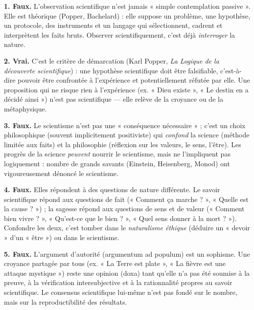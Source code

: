 \documentclass[11pt]{article}
\newcommand{\cle}[1]{{\popxbold\color{popdark}#1}}
\begin{document}
\begin{corrige}
\textbf{1. Faux.} L'observation scientifique n'est jamais « simple contemplation passive ». Elle est \cle{théorique} (Popper, Bachelard) : elle suppose un \cle{problème}, une \cle{hypothèse}, un \cle{protocole}, des \cle{instruments} et un \cle{langage} qui sélectionnent, cadrent et interprètent les faits bruts. Observer scientifiquement, c'est déjà \emph{interroger} la nature.

\textbf{2. Vrai.} C'est le critère de \cle{démarcation} (Karl Popper, \emph{La Logique de la découverte scientifique}) : une hypothèse scientifique doit être \cle{falsifiable}, c'est-à-dire pouvoir être confrontée à l'expérience et potentiellement réfutée par elle. Une proposition qui ne risque rien à l'expérience (ex. « Dieu existe », « Le destin en a décidé ainsi ») n'est pas scientifique — elle relève de la croyance ou de la métaphysique.

\textbf{3. Faux.} Le scientisme n'est pas une « conséquence nécessaire » ; c'est un \cle{choix philosophique} (souvent implicitement positiviste) qui \emph{confond} la science (méthode limitée aux faits) et la philosophie (réflexion sur les valeurs, le sens, l'être). Les progrès de la science \emph{peuvent} nourrir le scientisme, mais ne l'impliquent pas logiquement : nombre de grands savants (Einstein, Heisenberg, Monod) ont vigoureusement dénoncé le scientisme.

\textbf{4. Faux.} Elles répondent à des \cle{questions de nature différente}. Le savoir scientifique répond aux questions de \cle{fait} (« Comment ça marche ? », « Quelle est la cause ? ») ; la sagesse répond aux questions de \cle{sens} et de \cle{valeur} (« Comment bien vivre ? », « Qu'est-ce que le bien ? », « Quel sens donner à la mort ? »). Confondre les deux, c'est tomber dans le \emph{naturalisme éthique} (déduire un « devoir » d'un « être ») ou dans le scientisme.

\textbf{5. Faux.} L'\cle{argument d'autorité} (argumentum ad populum) est un sophisme. Une croyance partagée par tous (ex. « La Terre est plate », « La fièvre est une attaque mystique ») reste une \cle{opinion} (doxa) tant qu'elle n'a pas été soumise à la \cle{preuve}, à la \cle{vérification intersubjective} et à la \cle{rationnalité} propres au savoir scientifique. Le consensus scientifique lui-même n'est pas fondé sur le nombre, mais sur la \cle{reproductibilité} des résultats.
\end{corrige}
\end{document}
